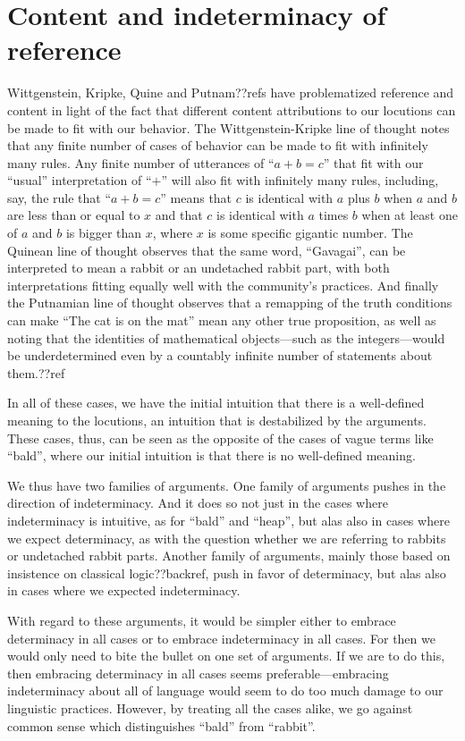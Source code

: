 \section{Content and indeterminacy of reference}
Wittgenstein, Kripke, Quine and Putnam??refs have problematized reference and content in light of the fact that different
content attributions to our locutions can be made to fit with our behavior. The Wittgenstein-Kripke line of thought notes
that any finite number of cases of behavior can be made to fit with infinitely many rules. Any finite number of utterances
of ``$a+b=c$'' that fit with our ``usual'' interpretation of ``$+$'' will also fit with infinitely many rules, including,
say, the rule that ``$a+b=c$'' means that $c$ is identical with $a$ plus $b$ 
when $a$ and $b$ are less than or equal to $x$ and 
that $c$ is identical with $a$ times $b$ when at least one of $a$ and $b$ is bigger than $x$, where $x$ is some specific gigantic number. The Quinean line of thought observes that the same word, ``Gavagai'',
can be interpreted to mean a rabbit or an undetached rabbit part, with both interpretations fitting equally well with the
community's practices. And finally the Putnamian line of thought observes that a remapping of the truth conditions can make
``The cat is on the mat'' mean any other true proposition, as well as noting that the identities of mathematical objects---such as
the integers---would be underdetermined even by a countably infinite number of statements about them.??ref 

In all of these cases, we have the initial intuition that there is a well-defined meaning to the locutions, an intuition that
is destabilized by the arguments. These cases, thus, can be seen as the opposite of the cases of vague terms like ``bald'', where
our initial intuition is that there is no well-defined meaning.

We thus have two families of arguments. One family of arguments pushes in the direction of indeterminacy. And it does so not
just in the cases where indeterminacy is intuitive, as for ``bald'' and ``heap'', but alas also in cases where we expect determinacy,
as with the question whether we are referring to rabbits or undetached rabbit parts. Another family of arguments, mainly those
based on insistence on classical logic??backref, push in favor of determinacy, but alas also in cases where we expected indeterminacy.

With regard to these arguments, it would be simpler either to embrace determinacy in all cases or to embrace indeterminacy in all 
cases. For then we would only need to bite the bullet on one set of arguments. If we are to do this, then embracing determinacy in
all cases seems preferable---embracing indeterminacy about all of language would seem to do too much damage to our linguistic practices.
However, by treating all the cases alike, we go against common sense which distinguishes ``bald'' from ``rabbit''. 

